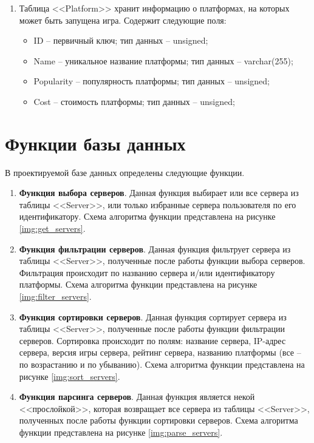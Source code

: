 \begin{enumerate}
        \item Таблица <<Platform>> хранит информацию о платформах, на которых может быть запущена игра. Содержит следующие поля:
        \begin{itemize}
            \item ID -- первичный ключ; тип данных -- unsigned;
            \item Name -- уникальное название платформы; тип данных -- varchar(255);
            \item Popularity -- популярность платформы; тип данных -- unsigned;
            \item Cost -- стоимость платформы; тип данных -- unsigned;
        \end{itemize}
\end{enumerate}


\section{Функции базы данных} \label{functions}

В проектируемой базе данных определены следующие функции.

\begin{enumerate}
    \item \textbf{Функция выбора серверов}. Данная функция выбирает или все сервера из таблицы <<Server>>, или только избранные сервера пользователя по его идентификатору. Схема алгоритма функции представлена на рисунке \ref{img:get_servers}.

    \item \textbf{Функция фильтрации серверов}. Данная функция фильтрует сервера из таблицы <<Server>>, полученные после работы функции выбора серверов. Фильтрация происходит по названию сервера и/или идентификатору платформы. Схема алгоритма функции представлена на рисунке \ref{img:filter_servers}.

    \item \textbf{Функция сортировки серверов}. Данная функция сортирует сервера из таблицы <<Server>>, полученные после работы функции фильтрации серверов. Сортировка происходит по полям: название сервера, IP-адрес сервера, версия игры сервера, рейтинг сервера, названию платформы (все -- по возрастанию и по убыванию). Схема алгоритма функции представлена на рисунке \ref{img:sort_servers}.

    \item \textbf{Функция парсинга серверов}. Данная функция является некой <<прослойкой>>, которая возвращает все сервера из таблицы <<Server>>, полученных после работы функции сортировки серверов. Схема алгоритма функции представлена на рисунке \ref{img:parse_servers}.
\end{enumerate}

